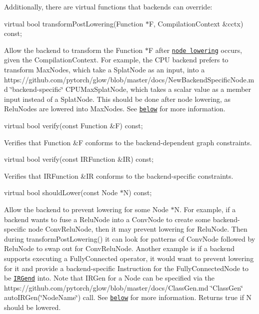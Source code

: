 Additionally, there are virtual functions that backends can override\+:


\begin{DoxyItemize}
\item {\ttfamily virtual bool transform\+Post\+Lowering(\+Function $\ast$\+F, Compilation\+Context \&cctx) const;}
\begin{DoxyItemize}
\item Allow the backend to transform the {\ttfamily Function $\ast$F} after \href{https://github.com/pytorch/glow/blob/master/docs/IR.md#node-lowering}{\tt node lowering} occurs, given the {\ttfamily Compilation\+Context}. For example, the C\+PU backend prefers to transform Max\+Nodes, which take a Splat\+Node as an input, into a https\+://github.com/pytorch/glow/blob/master/docs/\+New\+Backend\+Specific\+Node.\+md \char`\"{}backend-\/specific\char`\"{} C\+P\+U\+Max\+Splat\+Node, which takes a scalar value as a member input instead of a Splat\+Node. This should be done after node lowering, as Relu\+Nodes are lowered into Max\+Nodes. See \href{#backend-specific-nodes-and-instructions-transformations}{\tt below} for more information.
\end{DoxyItemize}
\item {\ttfamily virtual bool verify(const Function \&\+F) const;}
\begin{DoxyItemize}
\item Verifies that {\ttfamily Function \&F} conforms to the backend-\/dependent graph constraints.
\end{DoxyItemize}
\item {\ttfamily virtual bool verify(const I\+R\+Function \&\+I\+R) const;}
\begin{DoxyItemize}
\item Verifies that {\ttfamily I\+R\+Function \&IR} conforms to the backend-\/specific constraints.
\end{DoxyItemize}
\item {\ttfamily virtual bool should\+Lower(const Node $\ast$\+N) const;}
\begin{DoxyItemize}
\item Allow the backend to prevent lowering for some {\ttfamily Node $\ast$N}. For example, if a backend wants to fuse a {\ttfamily Relu\+Node} into a {\ttfamily Conv\+Node} to create some backend-\/specific node {\ttfamily Conv\+Relu\+Node}, then it may prevent lowering for {\ttfamily Relu\+Node}. Then during {\ttfamily transform\+Post\+Lowering()} it can look for patterns of {\ttfamily Conv\+Node} followed by {\ttfamily Relu\+Node} to swap out for {\ttfamily Conv\+Relu\+Node}. Another example is if a backend supports executing a Fully\+Connected operator, it would want to prevent lowering for it and provide a backend-\/specific Instruction for the Fully\+Connected\+Node to be \href{https://github.com/pytorch/glow/blob/master/docs/IR.md#low-level-ir}{\tt I\+R\+Gen\textquotesingle{}d} into. Note that I\+R\+Gen for a Node can be specified via the https\+://github.com/pytorch/glow/blob/master/docs/\+Class\+Gen.\+md \char`\"{}\+Class\+Gen\char`\"{} {\ttfamily auto\+I\+R\+Gen(\char`\"{}\+Node\+Name\char`\"{})} call. See \href{#backend-specific-nodes-and-instructions-transformations}{\tt below} for more information. Returns true if {\ttfamily N} should be lowered.

\end{DoxyItemize}
\end{DoxyItemize}
